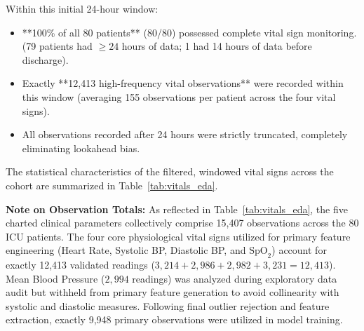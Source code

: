 Within this initial 24-hour window:
\begin{itemize}
    \item **100\% of all 80 patients** (80/80) possessed complete vital sign monitoring. (79 patients had $\ge 24$ hours of data; 1 had 14 hours of data before discharge).
    \item Exactly **12,413 high-frequency vital observations** were recorded within this window (averaging 155 observations per patient across the four vital signs).
    \item All observations recorded after 24 hours were strictly truncated, completely eliminating lookahead bias.
\end{itemize}

The statistical characteristics of the filtered, windowed vital signs across the cohort are summarized in Table~\ref{tab:vitals_eda}.

\begin{table}[htbp]
\centering
\caption{Exploratory Data Analysis: Statistical Distribution of 24-Hour Windowed Vital Signs ($N=80$ Patients)}
\label{tab:vitals_eda}
\end{table}

\noindent \textbf{Note on Observation Totals:} As reflected in Table~\ref{tab:vitals_eda}, the five charted clinical parameters collectively comprise 15,407 observations across the 80 ICU patients. The four core physiological vital signs utilized for primary feature engineering (Heart Rate, Systolic BP, Diastolic BP, and $\text{SpO}_2$) account for exactly 12,413 validated readings ($3,214 + 2,986 + 2,982 + 3,231 = 12,413$). Mean Blood Pressure ($2,994$ readings) was analyzed during exploratory data audit but withheld from primary feature generation to avoid collinearity with systolic and diastolic measures. Following final outlier rejection and feature extraction, exactly 9,948 primary observations were utilized in model training.

